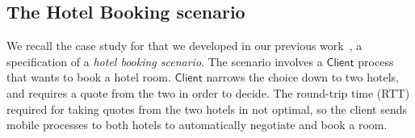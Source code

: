 \documentclass[preprint,11pt]{elsarticle}
\newcommand{\Client}{\mathsf{Client}}
\begin{document}
{%

\subsection{The Hotel Booking scenario}\label{ss:hotel}
We recall the case study for \HOp that we developed in our previous work~\cite{characteristic_bis,KouzapasPY17}, a specification of a \emph{hotel booking scenario}.
The scenario involves a $\Client$ process that wants to book
a hotel room. %
$\Client$
narrows the choice down to two hotels, and requires 
 a quote from the two in order to
decide. The round-trip time (RTT) required for
taking quotes from the two hotels in not optimal, %
so the client sends mobile processes to both hotels
to automatically negotiate and book a room. 


}
\end{document}
